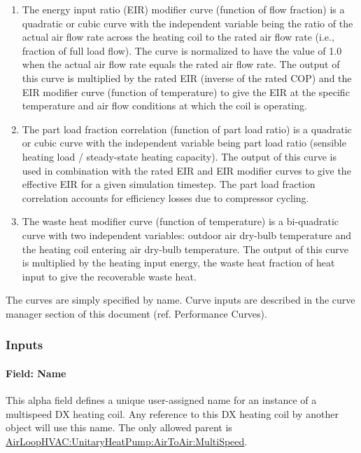 \begin{enumerate}
\item
  The energy input ratio (EIR) modifier curve (function of flow fraction) is a quadratic or cubic curve with the independent variable being the ratio of the actual air flow rate across the heating coil to the rated air flow rate (i.e., fraction of full load flow). The curve is normalized to have the value of 1.0 when the actual air flow rate equals the rated air flow rate. The output of this curve is multiplied by the rated EIR (inverse of the rated COP) and the EIR modifier curve (function of temperature) to give the EIR at the specific temperature and air flow conditions at which the coil is operating.
\item
  The part load fraction correlation (function of part load ratio) is a quadratic or cubic curve with the independent variable being part load ratio (sensible heating load / steady-state heating capacity). The output of this curve is used in combination with the rated EIR and EIR modifier curves to give the effective EIR for a given simulation timestep. The part load fraction correlation accounts for efficiency losses due to compressor cycling.
\item
  The waste heat modifier curve (function of temperature) is a bi-quadratic curve with two independent variables: outdoor air dry-bulb temperature and the heating coil entering air dry-bulb temperature. The output of this curve is multiplied by the heating input energy, the waste heat fraction of heat input to give the recoverable waste heat.
\end{enumerate}

The curves are simply specified by name. Curve inputs are described in the curve manager section of this document (ref. Performance Curves).

\subsubsection{Inputs}\label{inputs-20-001}

\paragraph{Field: Name}\label{field-name-19-001}

This alpha field defines a unique user-assigned name for an instance of a multispeed DX heating coil. Any reference to this DX heating coil by another object will use this name. The only allowed parent is \hyperref[airloophvacunitaryheatpumpairtoairmultispeed]{AirLoopHVAC:UnitaryHeatPump:AirToAir:MultiSpeed}.

